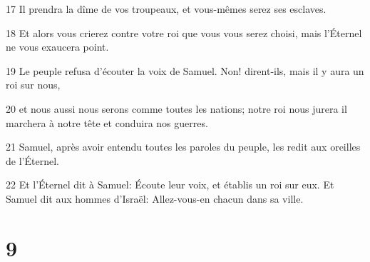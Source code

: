 \par 17 Il prendra la dîme de vos troupeaux, et vous-mêmes serez ses esclaves.
\par 18 Et alors vous crierez contre votre roi que vous vous serez choisi, mais l'Éternel ne vous exaucera point.
\par 19 Le peuple refusa d'écouter la voix de Samuel. Non! dirent-ils, mais il y aura un roi sur nous,
\par 20 et nous aussi nous serons comme toutes les nations; notre roi nous jurera il marchera à notre tête et conduira nos guerres.
\par 21 Samuel, après avoir entendu toutes les paroles du peuple, les redit aux oreilles de l'Éternel.
\par 22 Et l'Éternel dit à Samuel: Écoute leur voix, et établis un roi sur eux. Et Samuel dit aux hommes d'Israël: Allez-vous-en chacun dans sa ville.

\chapter{9}

